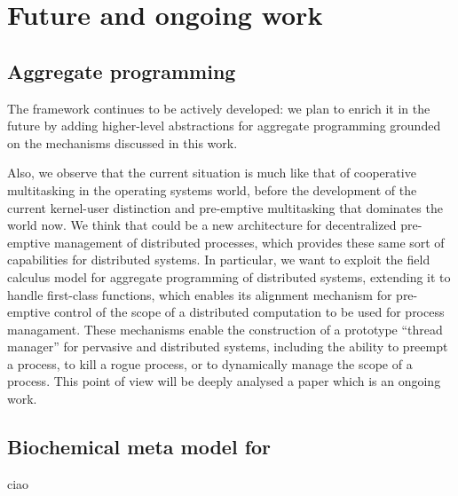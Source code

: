 \documentclass[12pt,a4paper,twoside,openright]{book}
\begin{document}
\chapter{Future and ongoing work}

\section{Aggregate programming}

The \protelis{} framework continues to be actively developed: we plan to enrich it in the future by adding higher-level abstractions for aggregate programming grounded on the mechanisms discussed in this work.

Also, we observe that the current situation is much like that of cooperative multitasking in the operating systems world, before the development of the current kernel-user distinction and pre-emptive multitasking that dominates the world now.
%
We think that \protelis{} could be a new architecture for decentralized pre-emptive management of distributed processes, which provides these same sort of capabilities for distributed systems.
%
In particular, we want to exploit the field calculus model for aggregate programming of distributed systems, extending it to handle first-class functions, which enables its alignment mechanism for pre-emptive control of the scope of a distributed computation to be used for process managament.
%
These mechanisms enable the construction of a prototype ``thread manager'' for pervasive and distributed systems, including the ability to preempt a process, to kill a rogue process, or to dynamically manage the scope of a process.
%
This point of view will be deeply analysed a paper which is an ongoing work.

\section{Biochemical meta model for \alchemist{}}
ciao

%
%
%

%

\small\protect\newpage{}



\end{document}
